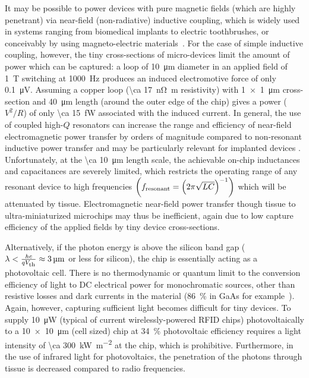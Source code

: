 It may be possible to power devices with pure magnetic fields (which are highly penetrant) via near-field (non-radiative) inductive coupling, which is widely used in systems ranging from biomedical implants to electric toothbrushes, or conceivably by using magneto-electric materials~\cite{Kitagawa2010, Priya2009, Yue2012, Fiebig2005}. For the case of simple inductive coupling, however, the tiny cross-sections of micro-devices limit the amount of power which can be captured: a loop of \SI{10}{\micro\meter} diameter in an applied field of \SI{1}{\tesla} switching at \SI{1000}{\hertz} produces an induced electromotive force of only \SI{0.1}{\micro\volt}. Assuming a copper loop (\SI{\ca 17}{\nano\ohm\meter} resistivity) with \SI{1 x 1}{\micro\meter} cross-section and \SI{40}{\micro\meter} length (around the outer edge of the chip) gives a power ($V^2/R$) of only \SI{\ca 15}{\femto\watt} associated with the induced current. In general, the use of coupled high-$Q$ resonators can increase the range and efficiency of near-field electromagnetic power transfer by orders of magnitude \cite{Karalis2008} compared to non-resonant inductive power transfer and may be particularly relevant for implanted devices \cite{Ho2013}. Unfortunately, at the \SI{\ca 10}{\micro\meter} length scale, the achievable on-chip inductances and capacitances are severely limited, which restricts the operating range of any resonant device to high frequencies $\left( f_{\text{\scriptsize resonant}} = \left(2\pi\sqrt{LC}\right)^{-1} \right)$ which will be attenuated by tissue. Electromagnetic near-field power transfer though tissue to ultra-miniaturized microchips may thus be inefficient, again due to low capture efficiency of the applied fields by tiny device cross-sections.

Alternatively, if the photon energy is above the silicon band gap ($\lambda < \frac{h c}{qV_{\text{\scriptsize th}}} \approx \SI{3}{\micro\meter}$ or less for silicon), the chip is essentially acting as a photovoltaic cell.
There is no thermodynamic or quantum limit to the conversion efficiency of light to DC electrical power for monochromatic sources, other than resistive losses and dark currents in the material (\SI{86}{\percent} in GaAs for example~\cite{bett08}). Again, however, capturing sufficient light becomes difficult for tiny devices.
To supply \SI{10}{\micro\watt} (typical of current wirelessly-powered RFID chips) photovoltaically to a \SI{10 x 10}{\micro\meter} (cell sized) chip at \SI{34}{\percent} photovoltaic efficiency requires a light intensity of \SI{\ca 300}{\kilo\watt\per\meter\squared} at the chip, which is prohibitive. Furthermore, in the use of infrared light for photovoltaics, the penetration of the photons through tissue is decreased compared to radio frequencies.


